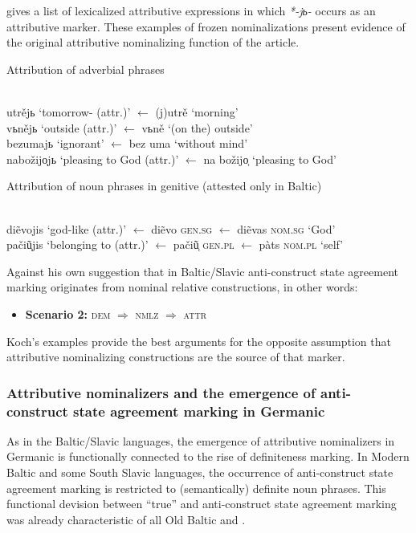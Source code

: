 \citet[467–468]{koch1999} gives a list of lexicalized attributive expressions in which \textit{*-jь-} occurs as an attributive marker. These examples of frozen nominalizations present evidence of the original attributive nominalizing function of the  article. 
\begin{exe}
\ex
\begin{xlist}
\ex \rm{Attribution of adverbial phrases}
\begin{xlist}
\ex \rm{}\\
	utrějь \rm{‘tomorrow- (attr.)’ $\leftarrow$} (j)utrě \rm{‘morning’}
\ex \rm{}\\
	vьnějь \rm{‘outside (attr.)’ $\leftarrow$} vьně \rm{‘(on the) outside’}\\
	bezumajь \rm{‘ignorant’ $\leftarrow$} bez uma \rm{‘without mind’}
\ex \rm{}\\
	nabožijo̜jь \rm{‘pleasing to God (attr.)’ $\leftarrow$} na božijo̜ \rm{‘pleasing to God’}
\end{xlist}
\ex \rm{Attribution of noun phrases in genitive (attested only in Baltic)}
\begin{xlist}
\ex \rm{}\\
	di\~evojis \rm{‘god-like (attr.)’ $\leftarrow$} di\~evo \rm{\textsc{gen.sg} $\leftarrow$} di\~evas \rm{\textsc{nom.sg} ‘God’}
\ex \rm{}\\
	pači\~u̜jis \rm{‘belonging to (attr.)’ $\leftarrow$} pači\~u̜ \rm{\textsc{gen.pl} $\leftarrow$} pàts \rm{\textsc{nom.pl} ‘self’}
\end{xlist}
\end{xlist}
\end{exe}
Against his own suggestion that in Baltic\slash{}Slavic anti\hyp{}construct state agreement marking originates from nominal relative constructions, in other words:
\begin{itemize}
\item \textbf{Scenario 2:} \textsc{dem $\Rightarrow$ nmlz $\Rightarrow$ attr}
\end{itemize}
Koch's examples provide the best arguments for the opposite assumption that attributive nominalizing constructions are the source of that marker.

\subsubsection[Germanic]{Attributive nominalizers and the emergence of anti\hyp{}construct state agreement marking in Germanic} \label{germanic diachr}
As in the Baltic\slash{}Slavic languages, the emergence of attributive nominalizers in Germanic is functionally connected to the rise of definiteness marking. In Modern Baltic and some South Slavic languages, the occurrence of anti\hyp{}construct state agreement marking is restricted to (semantically) definite noun phrases. This functional devision between “true”  and anti\hyp{}construct state agreement marking was already characteristic of all Old Baltic and . 

